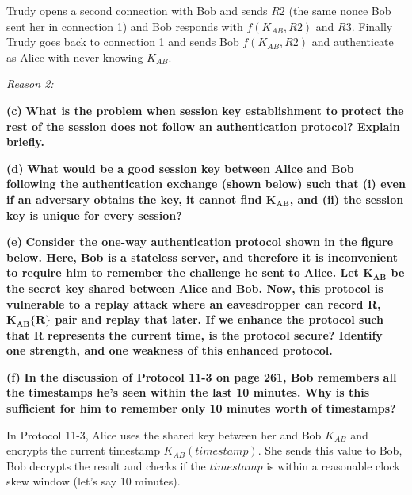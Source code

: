 \documentclass[11pt]{article}
\renewcommand\part[1]{\vspace{.10in}\textbf{(#1)}}
\begin{document}
Trudy opens a second connection with Bob and sends $R2$ (the same nonce Bob sent her in connection 1) and Bob responds with $f(K_{AB}, R2)$ and $R3$. Finally Trudy goes back to connection 1 and sends Bob $f(K_{AB}, R2)$ and authenticate as Alice with never knowing $K_{AB}$.

\textit{Reason 2:} 

\part{c} \textbf{What is the problem when session key establishment to protect the rest of the session does not follow an authentication protocol? Explain briefly.}

\part{d} \textbf{What would be a good session key between Alice and Bob following the authentication exchange (shown below) such that (i) even if an adversary obtains the key, it cannot find $\mathbf{K_{AB}}$, and (ii) the session key is unique for every session?}

\part{e} \textbf{Consider the one-way authentication protocol shown in the figure below. Here, Bob is a stateless server, and therefore it is inconvenient to require him to remember the challenge he sent to Alice. Let $\mathbf{K_{AB}}$ be the secret key shared between Alice and Bob. Now, this protocol is vulnerable to a replay attack where an eavesdropper can record R, $\mathbf{K_{AB}\{R\}}$ pair and replay that later. If we enhance the protocol such that R represents the current time, is the protocol secure? Identify one strength, and one weakness of this enhanced protocol.}

\part{f} \textbf{In the discussion of Protocol 11-3 on page 261, Bob remembers all the timestamps he's seen within the last 10 minutes. Why is this sufficient for him to remember only 10 minutes worth of timestamps?}

In Protocol 11-3, Alice uses the shared key between her and Bob $K_{AB}$ and encrypts the current timestamp $K_{AB}(timestamp)$. She sends this value to Bob, Bob decrypts the result and checks if the $timestamp$ is within a reasonable clock skew window (let's say 10 minutes).
\end{document}
